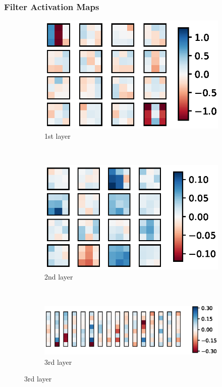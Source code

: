 \documentclass{beamer}
\begin{document}
\begin{frame}
\frametitle{Filter Activation Maps}
\begin{figure}[htbp]
\centering
\begin{subfigure}[b]{0.4\textwidth}
\centering
\includegraphics[scale=0.6]{figures/conv2d_layer_1.eps}
\caption{1st layer}
\end{subfigure}
~ %
\begin{subfigure}[b]{0.4\textwidth}
\centering
\includegraphics[scale=0.6]{figures/conv2d_layer_2.eps}
\caption{2nd layer}
\end{subfigure}
~ %
\begin{subfigure}[b]{0.9\textwidth}
\centering
\vspace{1em}
\includegraphics[scale=0.6]{figures/conv2d_layer_3.eps}
\caption{3rd layer}
\end{subfigure}
\end{figure}
\end{frame}
\end{document}
